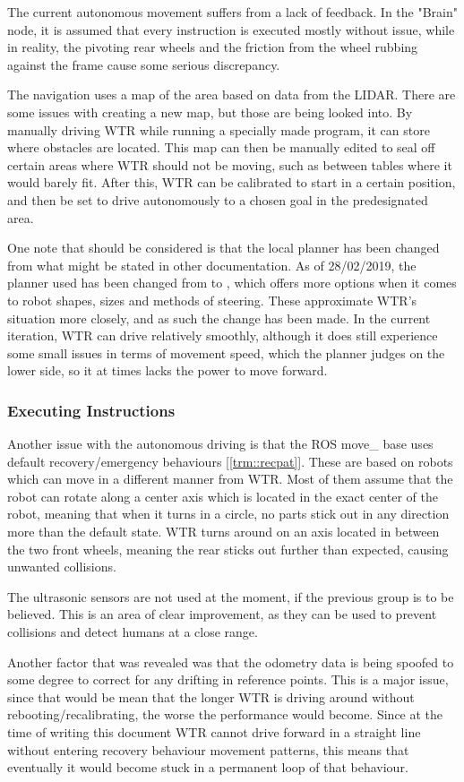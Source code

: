 The current autonomous movement suffers from a lack of feedback.
In the "Brain" node, it is assumed that every instruction is executed mostly without issue, while in reality, the pivoting rear wheels and the friction from the wheel rubbing against the frame cause some serious discrepancy.

The navigation uses a map of the area based on data from the LIDAR.
There are some issues with creating a new map, but those are being looked into.
By manually driving WTR while running a specially made program, it can store where obstacles are located.
This map can then be manually edited to seal off certain areas where WTR should not be moving, such as between tables where it would barely fit.
After this, WTR can be calibrated to start in a certain position, and then be set to drive autonomously to a chosen goal in the predesignated area.

One note that should be considered is that the local planner has been changed from what might be stated in other documentation.
As of 28/02/2019, the planner used has been changed from  to , which offers more options when it comes to robot shapes, sizes and methods of steering.
These approximate WTR's situation more closely, and as such the change has been made.
In the current iteration, WTR can drive relatively smoothly, although it does still experience some small issues in terms of movement speed, which the  planner judges on the lower side, so it at times lacks the power to move forward.

\subsubsection{Executing Instructions}
Another issue with the autonomous driving is that the ROS move\_ base uses default recovery/emergency behaviours [\ref{trm::recpat}].
These are based on robots which can move in a different manner from WTR.
Most of them assume that the robot can rotate along a center axis which is located in the exact center of the robot, meaning that when it turns in a circle, no parts stick out in any direction more than the default state.
WTR turns around on an axis located in between the two front wheels, meaning the rear sticks out further than expected, causing unwanted collisions.

The ultrasonic sensors are not used at the moment, if the previous group is to be believed.
This is an area of clear improvement, as they can be used to prevent collisions and detect humans at a close range.

Another factor that was revealed was that the odometry data is being spoofed to some degree to correct for any drifting in reference points.
This is a major issue, since that would be mean that the longer WTR is driving around without rebooting/recalibrating, the worse the performance would become.
Since at the time of writing this document WTR cannot drive forward in a straight line without entering recovery behaviour movement patterns, this means that eventually it would become stuck in a permanent loop of that behaviour.

\newpage
